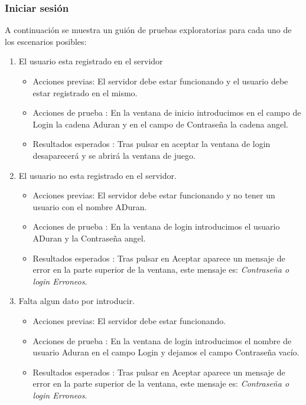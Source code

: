  \subsubsection{Iniciar sesión}

A continuación se muestra un guión de pruebas exploratorias para cada uno de los escenarios posibles:
\begin{enumerate}
\item El usuario esta registrado en el servidor
	\begin{itemize}
	\item Acciones previas: El servidor debe estar funcionando y el usuario debe estar registrado en el mismo.
	\item Acciones de prueba : En la ventana de inicio introducimos en el campo de Login la cadena Aduran y en el campo de Contraseña la cadena angel.
	\item Resultados esperados : Tras pulsar en aceptar la ventana de login desaparecerá y se abrirá la ventana de juego.
	\end{itemize}
\item El usuario no esta registrado en el servidor.
	\begin{itemize}
	\item Acciones previas: El servidor debe estar funcionando y no tener un usuario con el nombre ADuran.
	\item Acciones de prueba : En la ventana de login introducimos el usuario ADuran y la Contraseña angel.
	\item Resultados esperados : Tras pulsar en Aceptar aparece un mensaje de error en la parte superior de la ventana, este mensaje es: \emph {Contraseña o login Erroneos}.
	\end{itemize}

\item Falta algun dato por introducir.
	\begin{itemize}
	\item Acciones previas: El servidor debe estar funcionando.
	\item Acciones de prueba : En la ventana de login introducimos el nombre de usuario Aduran en el campo Login y dejamos el campo Contraseña vacío.
	\item Resultados esperados : Tras pulsar en Aceptar aparece un mensaje de error en la parte superior de la ventana, este mensaje es: \emph {Contraseña o login Erroneos}.
	\end{itemize}
\end{enumerate}

